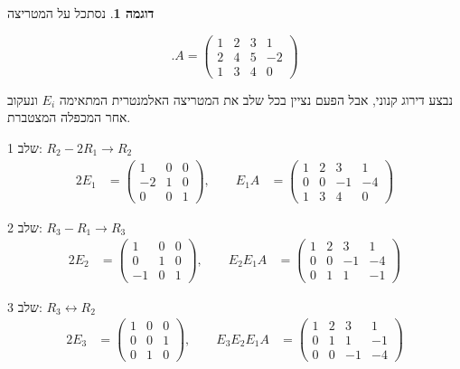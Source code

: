 \documentclass[12pt]{report}
\theoremstyle{plain}
\theoremstyle{definition}
\newtheorem{example}{דוגמה}[chapter]
\newcommand{\0}{\mathbf{0}}
\begin{document}
\begin{example}
נסתכל על המטריצה

$$
.A =
\begin{pmatrix}
1 & 2 & 3 & 1 \\
2 & 4 & 5 & -2 \\
1 & 3 & 4 & 0
\end{pmatrix}
$$

נבצע דירוג קנוני, אבל הפעם נציין בכל שלב את המטריצה האלמנטרית המתאימה
$E_i$
ונעקוב אחר המכפלה המצטברת.

שלב 1: $R_2 - 2R_1 \to R_2$
\begin{alignat*}{2}
E_1 &=
\begin{pmatrix}
1 & 0 & 0 \\
-2 & 1 & 0 \\
0 & 0 & 1
\end{pmatrix},
\qquad
E_1 A &=
\begin{pmatrix}
1 & 2 & 3 & 1 \\
0 & 0 & -1 & -4 \\
1 & 3 & 4 & 0
\end{pmatrix}
\end{alignat*}

שלב 2: $R_3 - R_1 \to R_3$
\begin{alignat*}{2}
E_2 &=
\begin{pmatrix}
1 & 0 & 0 \\
0 & 1 & 0 \\
-1 & 0 & 1
\end{pmatrix},
\qquad
E_2 E_1 A &=
\begin{pmatrix}
1 & 2 & 3 & 1 \\
0 & 0 & -1 & -4 \\
0 & 1 & 1 & -1
\end{pmatrix}
\end{alignat*}

שלב 3: $R_3 \leftrightarrow R_2$
\begin{alignat*}{2}
E_3 &=
\begin{pmatrix}
1 & 0 & 0 \\
0 & 0 & 1 \\
0 & 1 & 0
\end{pmatrix},
\qquad
E_3 E_2 E_1 A &=
\begin{pmatrix}
1 & 2 & 3 & 1 \\
0 & 1 & 1 & -1 \\
0 & 0 & -1 & -4
\end{pmatrix}
\end{alignat*}


\end{example}
\end{document}
